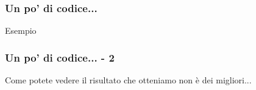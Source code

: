 \begin{frame}[fragile]
  \frametitle{Un po' di codice...}
  
  \begin{exampleblock}{Esempio}
    
  \end{exampleblock}
\end{frame}

\begin{frame}
 
 \frametitle{Un po' di codice... - 2}
 
 Come potete vedere il risultato che otteniamo non è dei migliori...
\end{frame}
